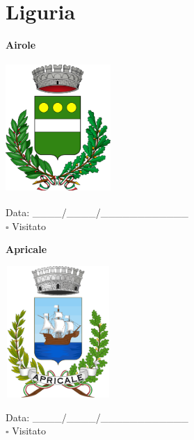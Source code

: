 \documentclass[a5paper,12pt]{article}
\begin{document}
\newpage

\section*{Liguria}

\newpage

\noindent
\begin{minipage}[t]{0.45\textwidth}
    \begin{center}
        \textbf{Airole}
    \end{center}
    \vspace{-0.5cm} %
    \begin{center}
        \includegraphics[height= 5cm, width=4cm]{Liguria/Stemma Airole.png}
    \end{center}
    \vspace{-0.4cm} %
    \begin{flushleft}
        Data: \_\_\_\_/\_\_\_\_/\_\_\_\_\_\_\_\_\_\_\_\_ \\
        $\square$ Visitato
    \end{flushleft}
\end{minipage}
\hfill
\noindent
\begin{minipage}[t]{0.45\textwidth}
    \begin{center}
        \textbf{Apricale}
    \end{center}
    \vspace{-0.5cm} %
    \begin{center}
        \includegraphics[height= 5cm, width=4cm]{Liguria/Stemma Apricale.png}
    \end{center}
    \vspace{-0.4cm} %
    \begin{flushleft}
        Data: \_\_\_\_/\_\_\_\_/\_\_\_\_\_\_\_\_\_\_\_\_ \\
        $\square$ Visitato
    \end{flushleft}
\end{minipage}
\end{document}
